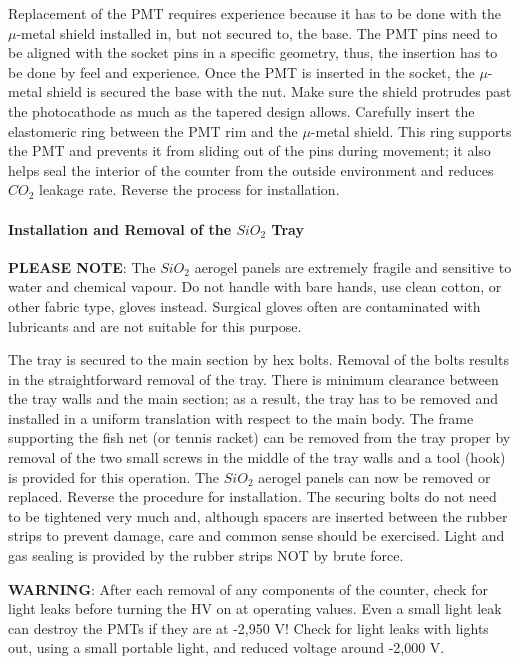 Replacement of the PMT requires experience because it has to be done with the
$\mu$-metal shield installed in, but not secured to, the base. The PMT pins
need to be aligned with the socket pins in a specific geometry, thus, the
insertion has to be done by feel and experience. Once the PMT is inserted in
the socket, the $\mu$-metal shield is secured the base with the nut. Make sure
the shield protrudes past the photocathode as much as the tapered design
allows. Carefully insert the elastomeric ring between the PMT rim and the
$\mu$-metal shield. This ring supports the PMT and prevents it from sliding 
out of the pins during movement; it also helps seal the interior of the counter
from the outside environment and reduces $CO_2$ leakage rate. 
Reverse the process for installation.

\paragraph{Installation and Removal of the $SiO_2$ Tray}

{\bf PLEASE NOTE}: The $SiO_2$ aerogel panels are extremely fragile and sensitive to 
water and chemical vapour. Do not handle with bare hands, use clean cotton, or 
other fabric type, gloves instead. Surgical gloves often are contaminated with 
lubricants and are not suitable for this purpose. 

The tray is secured to the main section by hex bolts. Removal of the bolts 
results in the straightforward removal of the tray. There is minimum clearance 
between the tray walls and the main section; as a result, the tray has to 
be removed and installed in a uniform translation with respect to the main 
body. The frame supporting the fish net (or tennis racket) can be removed from 
the tray proper by removal of the two small screws in the middle of the tray 
walls and a tool (hook) is provided for this operation. The $SiO_2$ aerogel 
panels can now be removed or replaced. Reverse the procedure for installation.
The securing bolts do not need to be tightened very much and, although spacers 
are inserted between the rubber strips to prevent damage, care and common sense 
 should be exercised. Light and gas sealing is provided by the 
rubber strips NOT by brute force.

{\bf WARNING}: After each removal of any components of the counter, check for light 
leaks before turning the HV on at operating values. Even a small light 
leak can destroy the PMTs if they are at -2,950 V! Check for light leaks with 
lights out, using a small portable light, and reduced voltage around -2,000 V.


